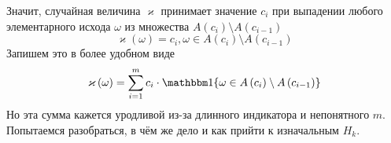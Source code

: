 \begin{comment}
Так происходит, потому что имеет место равенство,
которое выполняется из-за того,
что функция имеет скачки лишь на параметрах $c_i$,
а между ними не меняет значения
$$A\left( c_i \right) = A\left( c_{i+1} - 0 \right)$$

В таком случае тождество очевидно
\begin{align*}
A\left( c_i \right)
  = \left\{ \omega \mcond \varkappa\left( \omega \right) \le c_i \right\} = \\
  = \left\{ \omega \mcond \varkappa\left( \omega \right) < c_i \right\} \cup
      \left\{ \omega \mcond \varkappa\left( \omega \right) = c_i \right\} = \\
  = A\left( c_{i-1}-0 \right) \cup \varkappa^{-1}\left( c_i \right)
  = A\left( c_{i-1} \right) \cup \varkappa^{-1}\left( c_i \right)
\end{align*}

Поскольку $\varkappa$ --- случайная величина, принимающая $m$ значений,
то её прообразы составляют разбиение пространства элементарных исходов $\Omega$.
А поскольку $A\left( c_{i-1} \right)$ состоит из объединений этих прообразов,
то оно не пересекается с $\varkappa^{-1}\left( c_i \right)$.
То есть мы знаем, как вычислять прообраз $\varkappa$
\begin{align*}
  \begin{cases}
      A\left( c_{i-1} \right) \cap \varkappa^{-1}\left( c_i \right)
      = \emptyset \\
      A\left( c_i \right)
      = A\left( c_{i-1} \right) \cup \varkappa^{-1}\left( c_i \right)
  \end{cases}
  \Rightarrow \varkappa^{-1}\left( c_i \right) =
      A\left( c_{i} \right) \setminus A\left( c_{i-1} \right)
\end{align*}
\end{comment}
Значит, случайная величина $\varkappa$ принимает значение $c_i$
при выпадении любого элементарного исхода $\omega$
из множества $A\left( c_{i} \right) \setminus A\left( c_{i-1} \right)$
\begin{equation}\label{randomVariableFirst}
  \varkappa\left( \omega \right) = c_i,
      \omega \in A\left( c_{i} \right) \setminus A\left( c_{i-1} \right)
\end{equation}
Запишем это в более удобном виде
$$\varkappa\left( \omega \right)
  = \sum_{i=1}^m c_i \cdot \Indicator{\omega
      \in A\left( c_{i} \right) \setminus A\left( c_{i-1} \right)}$$
Но эта сумма кажется уродливой из-за длинного индикатора и непонятного $m$.
Попытаемся разобраться,
в чём же дело и как прийти к изначальным $H_k$.


